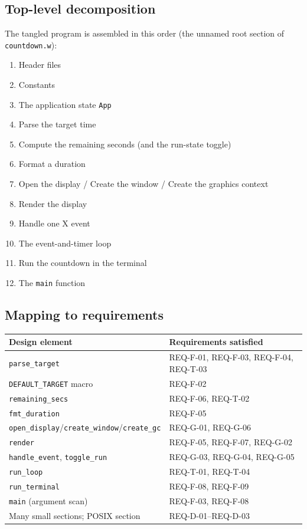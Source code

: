 \documentclass[12pt]{article}
\newcommand{\code}[1]{\texttt{#1}}
\begin{document}
\subsection{Top-level decomposition}

The tangled program is assembled in this order (the unnamed root section of
\code{countdown.w}):

\begin{enumerate}[noitemsep]
  \item Header files
  \item Constants
  \item The application state \code{App}
  \item Parse the target time
  \item Compute the remaining seconds (and the run-state toggle)
  \item Format a duration
  \item Open the display / Create the window / Create the graphics context
  \item Render the display
  \item Handle one X event
  \item The event-and-timer loop
  \item Run the countdown in the terminal
  \item The \code{main} function
\end{enumerate}

\subsection{Mapping to requirements}

\begin{longtable}{p{}p{}}
\toprule
\textbf{Design element} & \textbf{Requirements satisfied} \\
\midrule
\code{parse\_target} & REQ-F-01, REQ-F-03, REQ-F-04, REQ-T-03 \\
\code{DEFAULT\_TARGET} macro & REQ-F-02 \\
\code{remaining\_secs} & REQ-F-06, REQ-T-02 \\
\code{fmt\_duration} & REQ-F-05 \\
\code{open\_display}/\code{create\_window}/\code{create\_gc} & REQ-G-01, REQ-G-06 \\
\code{render} & REQ-F-05, REQ-F-07, REQ-G-02 \\
\code{handle\_event}, \code{toggle\_run} & REQ-G-03, REQ-G-04, REQ-G-05 \\
\code{run\_loop} & REQ-T-01, REQ-T-04 \\
\code{run\_terminal} & REQ-F-08, REQ-F-09 \\
\code{main} (argument scan) & REQ-F-03, REQ-F-08 \\
Many small sections; POSIX section & REQ-D-01--REQ-D-03 \\
\bottomrule
\end{longtable}
\end{document}
